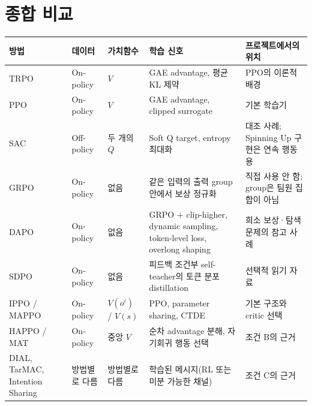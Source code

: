\documentclass[11pt,a4paper]{article}
\begin{document}
\section{종합 비교}
\begin{center}
\footnotesize
\renewcommand{\arraystretch}{1.25}
\begin{tabular}{|>{\raggedright\arraybackslash}p{19mm}|>{\raggedright\arraybackslash}p{15mm}|>{\raggedright\arraybackslash}p{18mm}|>{\raggedright\arraybackslash}p{42mm}|>{\raggedright\arraybackslash}p{40mm}|}
\hline
\textbf{방법} & \textbf{데이터} & \textbf{가치함수} & \textbf{학습 신호} & \textbf{프로젝트에서의 위치}\\ \hline
TRPO & On-policy & \(V\) & GAE advantage, 평균 KL 제약 & PPO의 이론적 배경\\ \hline
PPO & On-policy & \(V\) & GAE advantage, clipped surrogate & 기본 학습기\\ \hline
SAC & Off-policy & 두 개의 \(Q\) & Soft Q target, entropy 최대화 & 대조 사례; Spinning Up 구현은 연속 행동용\\ \hline
GRPO & On-policy & 없음 & 같은 입력의 출력 group 안에서 보상 정규화 & 직접 사용 안 함; group은 팀원 집합이 아님\\ \hline
DAPO & On-policy & 없음 & GRPO + clip-higher, dynamic sampling, token-level loss, overlong shaping & 희소 보상·탐색 문제의 참고 사례\\ \hline
SDPO & On-policy & 없음 & 피드백 조건부 self-teacher의 토큰 분포 distillation & 선택적 읽기 자료\\ \hline
IPPO / MAPPO & On-policy & \(V(o^i)\) / \(V(s)\) & PPO, parameter sharing, CTDE & 기본 구조와 critic 선택\\ \hline
HAPPO / MAT & On-policy & 중앙 \(V\) & 순차 advantage 분해, 자기회귀 행동 선택 & 조건 B의 근거\\ \hline
DIAL, TarMAC, Intention Sharing & 방법별로 다름 & 방법별로 다름 & 학습된 메시지(RL 또는 미분 가능한 채널) & 조건 C의 근거\\ \hline
\end{tabular}
\end{center}
\end{document}
